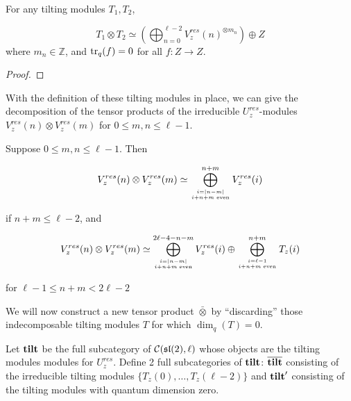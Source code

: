 \begin{prop}
    For any tilting modules $T_1, T_2$, 

    \begin{equation}
            T_1 \otimes T_2 \simeq \left(\bigoplus_{n=0}^{\ell - 2} V_z^{res}(n)^{\otimes m_n}\right) \oplus Z
    \end{equation}
    where $m_n \in \mathbb{Z}$, and $\operatorname{tr}_q(f) = 0$ for all $f: Z \to Z$.
\end{prop}
\begin{proof}
\end{proof}

 With the definition of these
tilting modules in place, we can give the decomposition of the tensor products
of the irreducible $U_z^{res}$-modules $V_z^{res}(n) \otimes V_z^{res}(m)$ for
$0 \leq m,n \leq \ell - 1$. 

\begin{prop}
Suppose $0 \leq m,n \leq \ell - 1$. Then

\begin{equation}
V_z^{res}(n) \otimes V_{z}^{res}(m) \simeq \bigoplus_{i=|n-m| \atop i + n + m \text{ even}}^{n+m} V_z^{res}(i) 
\end{equation}

if $n+m \leq \ell - 2$, and 

\begin{equation}
V_z^{res}(n) \otimes V_{z}^{res}(m) \simeq \bigoplus_{i=|n-m| \atop i + n + m \text{ even}}^{2\ell - 4 - n - m} V_z^{res}(i) 
                                    \oplus \bigoplus_{i = \ell - 1 \atop i + n + m \text{ even}} ^{n + m} T_z(i)
\end{equation}

for $\ell - 1 \leq n + m < 2\ell - 2$
\end{prop}

We will now construct a new tensor product $\bar{\otimes}$ by ``discarding''
those indecomposable tilting modules $T$ for which $\dim_q(T) = 0$.


Let $\mathbf{tilt}$ be the full subcategory of $\mathcal{C}(\mathfrak{sl}(2), \ell)$ whose
objects are the tilting modules modules for $U_z^{res}$. Define 2 full
subcategories of $\mathbf{tilt}$: $\overline{\mathbf{tilt}}$ consisting of the
irreducible tilting modules $\{T_z(0), \ldots, T_z(\ell - 2)\}$ and $\mathbf{tilt}'$
consisting of the tilting modules with quantum dimension zero. 

